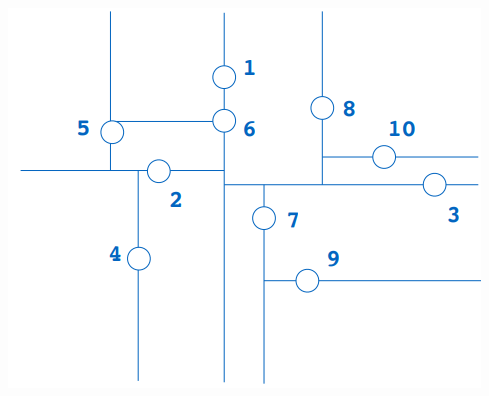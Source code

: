 \begin{Exercice}[5 minutes]
\begin{solution}
    \includegraphics[scale=1]{DivisionEspace}
\end{solution}
\end{Exercice}

\newpage

